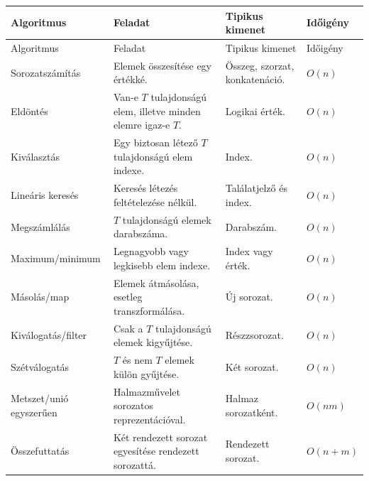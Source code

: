 \begingroup
\setlength{\tabcolsep}{4pt}
\begin{longtable}{L{0.17\textwidth}L{0.37\textwidth}L{0.18\textwidth}L{0.16\textwidth}}
\toprule
Algoritmus & Feladat & Tipikus kimenet & Időigény \\
\midrule
\endfirsthead
\toprule
Algoritmus & Feladat & Tipikus kimenet & Időigény \\
\midrule
\endhead
Sorozatszámítás & Elemek összesítése egy értékké. & Összeg, szorzat, konkatenáció. & $O(n)$ \\
Eldöntés & Van-e $T$ tulajdonságú elem, illetve minden elemre igaz-e $T$. & Logikai érték. & $O(n)$ \\
Kiválasztás & Egy biztosan létező $T$ tulajdonságú elem indexe. & Index. & $O(n)$ \\
Lineáris keresés & Keresés létezés feltételezése nélkül. & Találatjelző és index. & $O(n)$ \\
Megszámlálás & $T$ tulajdonságú elemek darabszáma. & Darabszám. & $O(n)$ \\
Maximum/minimum & Legnagyobb vagy legkisebb elem indexe. & Index vagy érték. & $O(n)$ \\
Másolás/map & Elemek átmásolása, esetleg transzformálása. & Új sorozat. & $O(n)$ \\
Kiválogatás/filter & Csak a $T$ tulajdonságú elemek kigyűjtése. & Részzsorozat. & $O(n)$ \\
Szétválogatás & $T$ és nem $T$ elemek külön gyűjtése. & Két sorozat. & $O(n)$ \\
Metszet/unió egyszerűen & Halmazművelet sorozatos reprezentációval. & Halmaz sorozatként. & $O(nm)$ \\
Összefuttatás & Két rendezett sorozat egyesítése rendezett sorozattá. & Rendezett sorozat. & $O(n+m)$ \\
\bottomrule
\end{longtable}
\endgroup
